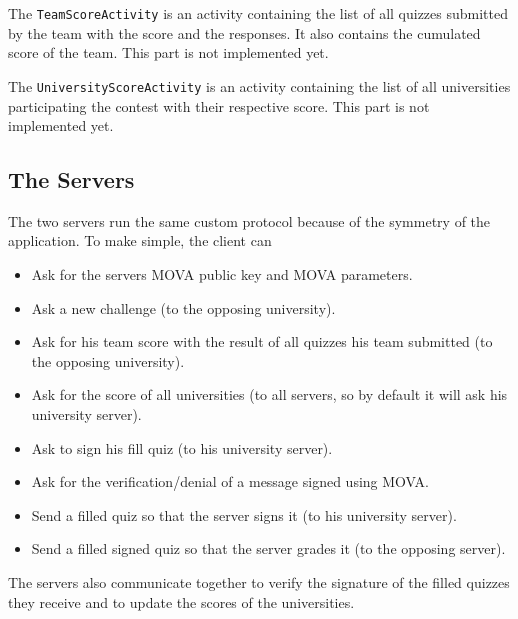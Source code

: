 \documentclass[12pt,4paper]{article}
\begin{document}
    The \texttt{TeamScoreActivity} is an activity containing the list of all quizzes submitted by the team with the score and the responses. It also contains the cumulated score of the team.
    This part is not implemented yet.

    The \texttt{UniversityScoreActivity} is an activity containing the list of all universities participating the contest with their respective score.
    This part is not implemented yet.

    \subsection{The Servers}
    The two servers run the same custom protocol because of the symmetry of the application. To make simple, the client can
    \begin{itemize}
        \item Ask for the servers MOVA public key and MOVA parameters.
        \item Ask a new challenge (to the opposing university).
        \item Ask for his team score with the result of all quizzes his team submitted (to the opposing university).
        \item Ask for the score of all universities (to all servers, so by default it will ask his university server).
        \item Ask to sign his fill quiz (to his university server).
        \item Ask for the verification/denial of a message signed using MOVA.
        \item Send a filled quiz so that the server signs it (to his university server).
        \item Send a filled signed quiz so that the server grades it (to the opposing server).
    \end{itemize}
    The servers also communicate together to verify the signature of the filled quizzes they receive and to update the scores of the universities. 
    

    



 
\end{document}
